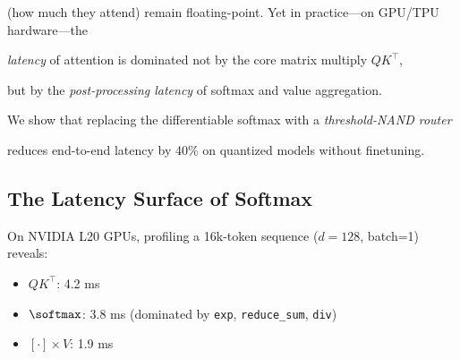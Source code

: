 (how much they attend) remain floating-point. Yet in practice---on GPU/TPU hardware---the





\emph{latency} of attention is dominated not by the core matrix multiply $QK^\top$,





but by the \emph{post-processing latency} of softmax and value aggregation.





We show that replacing the differentiable softmax with a \emph{threshold-NAND router}





reduces end-to-end latency by 40\% on quantized models without finetuning.











\subsection{The Latency Surface of Softmax}











On NVIDIA L20 GPUs, profiling a 16k-token sequence ($d=128$, batch=1) reveals:





\begin{itemize}





    \item $QK^\top$: 4.2 ms





    \item $\softmax$: 3.8 ms (dominated by \texttt{exp}, \texttt{reduce\_sum}, \texttt{div})





    \item $[\cdot]\times V$: 1.9 ms





\end{itemize}





